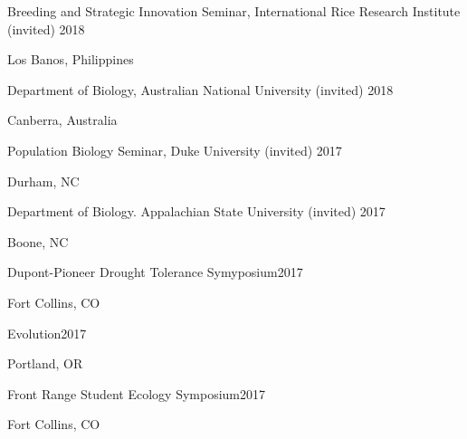 \documentclass[12pt,english]{article}
\begin{document}
\hspace*{1.0em}Breeding and Strategic Innovation Seminar, International Rice Research Institute (invited) \hfill 2018 \par
\hspace*{2.0em}Los Banos, Philippines \par\vspace{0.5ex}

\hspace*{1.0em}Department of Biology, Australian National University (invited) \hfill 2018 \par
\hspace*{2.0em}Canberra, Australia \par\vspace{0.5ex}

\hspace*{1.0em}Population Biology Seminar,  Duke University (invited) \hfill 2017 \par
\hspace*{2.0em}Durham, NC \par\vspace{0.5ex}

\hspace*{1.0em}Department of Biology. Appalachian State University (invited) \hfill 2017 \par
\hspace*{2.0em}Boone, NC  \par\vspace{0.5ex}

\hspace*{1.0em}Dupont-Pioneer Drought Tolerance Symyposium\hfill 2017 \par
\hspace*{2.0em}Fort Collins, CO \par\vspace{0.5ex}

\hspace*{1.0em}Evolution\hfill 2017 \par
\hspace*{2.0em}Portland, OR \par\vspace{0.5ex}

\hspace*{1.0em}Front Range Student Ecology Symposium\hfill 2017 \par
\hspace*{2.0em}Fort Collins, CO \par\vspace{0.5ex}
\end{document}
